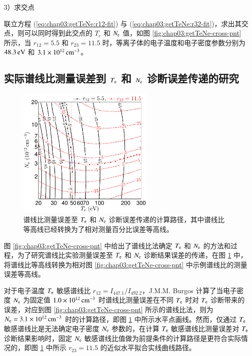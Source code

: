 3）求交点

联立方程 (\ref{eq:chap03:getTeNe:r12-fit}) 与 (\ref{eq:chap03:getTeNe:r32-fit})，求出其交点，则可以同时得到此交点的 $T_{e}$ 和 $N_{\rm e}$ 值，如图 \ref{fig:chap03:getTeNe-cross-pnt} 所示，当 $r_{12}=5.5$ 和 $r_{23}=11.5$ 时，等离子体的电子温度和电子密度参数分别为 $48.3\,{\rm eV}$ 和 $3.1\times10^{12}\,{\rm cm}^{-3}$。

\subsection{实际谱线比测量误差到 $T_{\rm e}$ 和 $N_{\rm e}$ 诊断误差传递的研究}
\label{sec:chap03:lineratio-error-to-result-error}

\begin{figure}%
  \centering
  \includegraphics[width=0.6\textwidth]{6-9to7-7to5-getTeNe-errorroute.pdf}
  \caption{谱线比测量误差至 $T_{\rm e}$ 和 $N_{\rm e}$ 诊断误差传递的计算路径，其中谱线比等高线已经转换为了相对测量百分比误差等高线。}
  \label{fig:chap03:getTeNe-error-route}
\end{figure}

图 \ref{fig:chap03:getTeNe-cross-pnt} 中给出了谱线比法确定 $T_{\rm e}$ 和 $N_{\rm e}$ 的方法和过程，为了研究谱线比实验测量误差至 $T_{\rm e}$ 和 $N_{\rm e}$ 诊断结果误差的传递，在图 \ref{fig:chap03:getTeNe-error-route} 中，将谱线比等高线转换为相对图 \ref{fig:chap03:getTeNe-cross-pnt} 中示例谱线比的测量误差等高线。

对于电子温度 $T_{\rm e}$ 敏感谱线比 $r_{12}=I_{447.1}/I_{492.2}$，J.M.M. Burgos\cite{burgos2012:PoP} 计算了当电子密度 $N_{\rm e}$ 为固定值 $1.0\times10^{12}\,{\rm cm}^{-3}$ 时谱线比测量误差在不同 $T_{\rm e}$ 时对 $T_{\rm e}$ 诊断带来的误差，对应到图 \ref{fig:chap03:getTeNe-cross-pnt} 所示的谱线比法，则为 $N_{\rm e}=3.1\times10^{12}\,{\rm cm}^{-3}$ 时的计算路径，即图 \ref{fig:chap03:getTeNe-error-route} 中所示水平点画线。然而，仅通过 $T_{\rm e}$ 敏感谱线比是无法确定电子密度 $N_{\rm e}$ 参数的，在计算 $T_{\rm e}$ 敏感谱线比测量误差对 $T_{\rm e}$ 诊断结果影响时，固定 $N_{\rm e}$ 敏感谱线比值做为前提条件的计算路径是更符合实际情况的，即图 \ref{fig:chap03:getTeNe-error-route} 中所示 $r_{23}=11.5$ 的近似水平拟合实线曲线路径。

